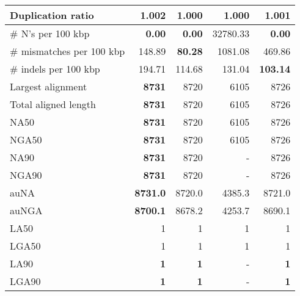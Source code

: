 \documentclass[12pt,a4paper]{article}
\begin{document}
\begin{table}[ht]
\begin{center}
\begin{tabular}{|l*{4}{|r}|}
Duplication ratio & 1.002 & {\bf 1.000} & {\bf 1.000} & 1.001 \\ \hline
\# N's per 100 kbp & {\bf 0.00} & {\bf 0.00} & 32780.33 & {\bf 0.00} \\ \hline
\# mismatches per 100 kbp & 148.89 & {\bf 80.28} & 1081.08 & 469.86 \\ \hline
\# indels per 100 kbp & 194.71 & 114.68 & 131.04 & {\bf 103.14} \\ \hline
Largest alignment & {\bf 8731} & 8720 & 6105 & 8726 \\ \hline
Total aligned length & {\bf 8731} & 8720 & 6105 & 8726 \\ \hline
NA50 & {\bf 8731} & 8720 & 6105 & 8726 \\ \hline
NGA50 & {\bf 8731} & 8720 & 6105 & 8726 \\ \hline
NA90 & {\bf 8731} & 8720 & - & 8726 \\ \hline
NGA90 & {\bf 8731} & 8720 & - & 8726 \\ \hline
auNA & {\bf 8731.0} & 8720.0 & 4385.3 & 8721.0 \\ \hline
auNGA & {\bf 8700.1} & 8678.2 & 4253.7 & 8690.1 \\ \hline
LA50 & 1 & 1 & 1 & 1 \\ \hline
LGA50 & 1 & 1 & 1 & 1 \\ \hline
LA90 & {\bf 1} & {\bf 1} & - & {\bf 1} \\ \hline
LGA90 & {\bf 1} & {\bf 1} & - & {\bf 1} \\ \hline
\end{tabular}
\end{center}
\end{table}
\end{document}
